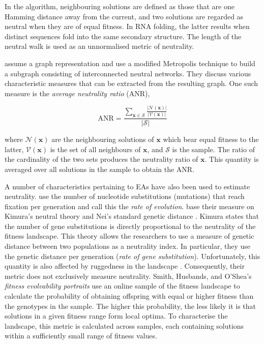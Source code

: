 \documentclass[conference]{IEEEtran}
\renewcommand{\vec}[1]{\mathbf{#1}}
\begin{document}
In the algorithm, neighbouring solutions are defined as those that are one Hamming distance away from the current, and two solutions are regarded as neutral when they are of equal fitness. In RNA folding, the latter results when distinct sequences fold into the same secondary structure. The length of the neutral walk is used as an unnormalised metric of neutrality. 

\citet{vanneschi2006quantitative} assume a graph representation and use a modified Metropolis technique to build a subgraph consisting of interconnected neutral networks. They discuss various characteristic measures that can be extracted from the resulting graph. One such measure is the \textit{average neutrality ratio} (ANR),

\begin{equation}
\label{eqAvgNeutralityRatio}	
	\text{ANR} = \frac{\sum_{\vec{x} \in \mathcal{S}}^{} \frac{\lvert \mathcal{N}(\vec{x}) \rvert}{\lvert \mathcal{V}(\vec{x}) \rvert}}{\lvert \mathcal{S} \rvert}
\end{equation} 

where $\mathcal{N}(\vec{x})$ are the neighbouring solutions of $\vec{x}$ which bear equal fitness to the latter, $\mathcal{V}(\vec{x})$ is the set of all neighbours of $\vec{x}$, and $\mathcal{S}$ is the sample. The ratio of the cardinality of the two sets produces the neutrality ratio of $\vec{x}$. This quantity is averaged over all solutions in the sample to obtain the ANR.

A number of characteristics pertaining to EAs have also been used to estimate neutrality. \citet{huynen1996smoothness} use the number of nucleotide substitutions (mutations) that reach fixation per generation and call this the \textit{rate of evolution}. \citet{katada2003measuring} base their measure on Kimura's neutral theory \cite{kimura1984neutral} and Nei's standard genetic distance \cite{nei1972genetic}. Kimura states that the number of gene substitutions is directly proportional to the neutrality of the fitness landscape. This theory allows the researchers to use a measure of genetic distance between two populations as a neutrality index. In particular, they use the genetic distance per generation (\textit{rate of gene substitution}). Unfortunately, this quantity is also affected by ruggedness in the landscape \cite{katada2003measuring}. Consequently, their metric does not exclusively measure neutrality. Smith, Husbands, and O'Shea's \textit{fitness evolvability portraits} \cite{smith2002fitness} use an online sample of the fitness landscape to calculate the probability of obtaining offspring with equal or higher fitness than the genotypes in the sample. The higher this probability, the less likely it is that solutions in a given fitness range form local optima. To characterise the landscape, this metric is calculated across samples, each containing solutions within a sufficiently small range of fitness values.
\end{document}
